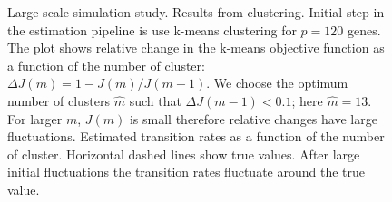 \begin{figure}
  \centering
  \caption{Large scale simulation study. Results from clustering.  Initial step in the estimation pipeline is use k-means clustering for $p=120$ genes. The plot shows relative change in the k-means objective function as a function of the number of cluster: $\Delta J(m) = 1 - J(m) / J(m - 1)$. We choose the optimum number of clusters $\hat{m}$ such that $\Delta J(m - 1) < 0.1$; here $\hat{m} = 13$. For larger $m$, $J(m)$ is small therefore relative changes have large fluctuations.  Estimated transition rates as a function of the number of cluster. Horizontal dashed lines show true values. After large initial fluctuations the transition rates fluctuate around the true value.}
  \label{fig:lrg-sim-clust}
\end{figure}

